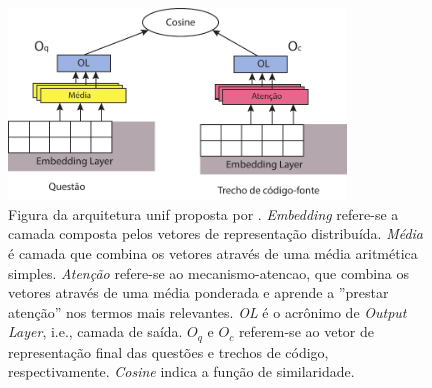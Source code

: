 \begin{figure}[h]
    \centering
    \includegraphics[width=0.8\textwidth]{figuras/cap-experimento/unif-architecture.pdf}
    \caption{Figura da arquitetura \Gls{unif} proposta por \cite{cambronero-deep-learning-code-search:2019}. \emph{Embedding} refere-se a camada composta pelos vetores de representação distribuída. \emph{Média} é camada que combina os vetores através de uma média aritmética simples. \emph{Atenção} refere-se ao \gls{mecanismo-atencao}, que combina os vetores através de uma média ponderada e aprende a ''prestar atenção'' nos termos mais relevantes. \emph{OL} é o acrônimo de \emph{Output Layer}, i.e., camada de saída. $O_{q}$ e $O_{c}$ referem-se ao vetor de representação final das questões e trechos de código, respectivamente. \emph{Cosine} indica a função de similaridade. }
    \label{fig:unif-architecture}
\end{figure}

